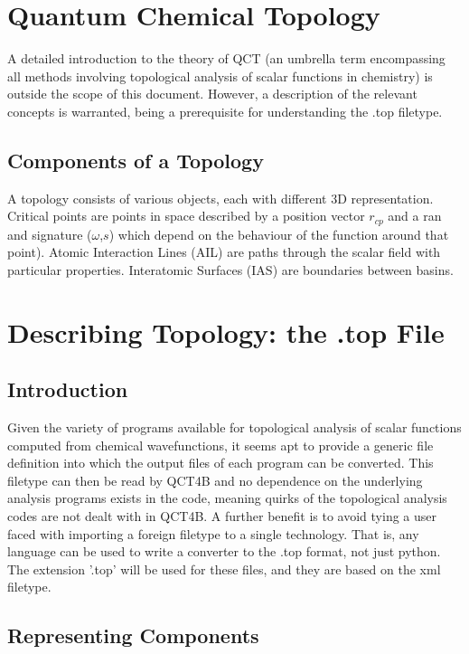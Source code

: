 \documentclass{report}
\begin{document}
\chapter{Quantum Chemical Topology}

A detailed introduction to the theory of QCT (an umbrella term encompassing all methods involving topological analysis of scalar functions in chemistry) is outside the scope of this document.
However, a description of the relevant concepts is warranted, being a prerequisite for understanding the .top filetype.

\section{Components of a Topology}

A topology consists of various objects, each with different 3D representation. 
Critical points are points in space described by a position vector $r_{cp}$ and a ran and signature ($\omega$,$s$) which depend on the behaviour of the function around that point).
Atomic Interaction Lines (AIL) are paths through the scalar field with particular properties.
Interatomic Surfaces (IAS) are boundaries between basins.

\chapter{Describing Topology: the .top File}

\section{Introduction}

Given the variety of programs available for topological analysis of scalar functions computed from chemical wavefunctions,
it seems apt to provide a generic file definition into which the output files of each program can be converted.
This filetype can then be read by QCT4B and no dependence on the underlying analysis programs exists in the code, meaning quirks of the topological analysis codes are not dealt with in QCT4B.
A further benefit is to avoid tying a user faced with importing a foreign filetype to a single technology.
That is, any language can be used to write a converter to the .top format, not just python.
The extension '.top' will be used for these files, and they are based on the xml filetype.

\section{Representing Components}
\end{document}
